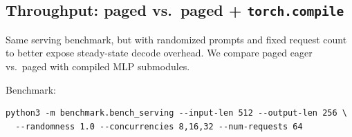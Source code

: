 \documentclass[11pt]{article}
\begin{document}
\begin{table}[htbp]
  \centering
  \caption{Batched vs.\ paged \texttt{bench\_serving} (512 input / 256 output tokens). TTFT and completion in ms; TPOT in ms/token.}
  \label{tab:batched-paged}
\end{table}

\subsection{Throughput: paged vs.\ paged + \texttt{torch.compile}}

\noindent Same serving benchmark, but with randomized prompts and fixed request count to better expose steady-state decode overhead. We compare paged eager vs.\ paged with compiled MLP submodules.

\noindent Benchmark:
\begin{verbatim}
python3 -m benchmark.bench_serving --input-len 512 --output-len 256 \
  --randomness 1.0 --concurrencies 8,16,32 --num-requests 64
\end{verbatim}
\end{document}
